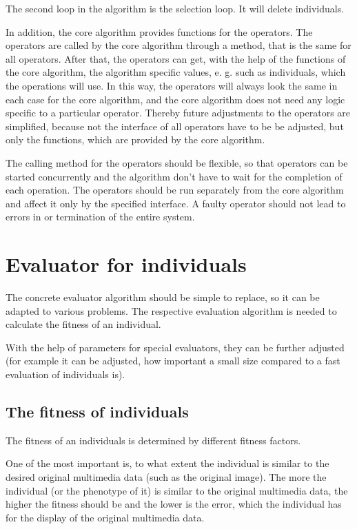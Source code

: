 The second loop in the algorithm is the selection loop. It will delete individuals.

\bigskip
In addition, the core algorithm provides functions for the operators. The operators are called by the core algorithm through a method, that is the same for all operators. After that, the operators can get, with the help of the functions of the core algorithm, the algorithm specific values, e. g. such as individuals, which the operations will use. In this way, the operators will always look the same in each case for the core algorithm, and the core algorithm does not need any logic specific to a particular operator. Thereby future adjustments to the operators are simplified, because not the interface of all operators have to be be adjusted, but only the functions, which are provided by the core algorithm.

The calling method for the operators should be flexible, so that operators can be started concurrently and the algorithm don't have to wait for the completion of each operation. The operators should be run separately from the core algorithm and affect it only by the specified interface. A faulty operator should not lead to errors in or termination of the entire system.


\section{Evaluator for individuals}

The concrete evaluator algorithm should be simple to replace, so it can be adapted to various problems. The respective evaluation algorithm is needed to calculate the fitness of an individual.

With the help of parameters for special evaluators, they can be further adjusted (for example it can be adjusted, how important a small size compared to a fast evaluation of individuals is).


\subsection{The fitness of individuals}

The fitness of an individuals is determined by different fitness factors.

One of the most important is, to what extent the individual is similar to the desired original multimedia data (such as the original image). The more the individual (or the phenotype of it) is similar to the original multimedia data, the higher the fitness should be and the lower is the error, which the individual has for the display of the original multimedia data.

